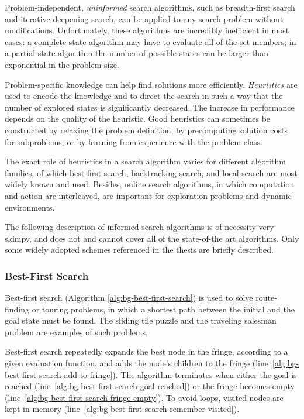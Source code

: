 Problem-independent, {\it uninformed} search algorithms, such as
breadth-first search and iterative deepening search, can be
applied to any search problem without modifications. Unfortunately,
these algorithms are incredibly inefficient in most cases: a
complete-state algorithm may have to evaluate all of the set members;
in a partial-state algorithm the number of possible states can be
larger than exponential in the problem size. 

Problem-specific knowledge can help find solutions more
efficiently. {\em Heuristics} are used to encode the knowledge and to
direct the search in such a way that the number of explored states is
significantly decreased. The increase in performance depends on the
quality of the heuristic. Good heuristics can sometimes be constructed
by relaxing the problem definition, by precomputing solution costs for
subproblems, or by learning from experience with the problem class.

The exact role of heuristics in a search algorithm varies for
different algorithm families, of which best-first search, backtracking
search, and local search are most widely known and used. Besides, online
search algorithms, in which computation and action are interleaved,
are important for exploration problems and dynamic environments.

The following description of informed search algorithms is of
necessity very skimpy, and does not and cannot cover all of the
state-of-the art algorithms. Only some widely adopted schemes
referenced in the thesis are briefly described.
                             
\subsubsection{Best-First Search}

Best-first search (Algorithm \ref{alg:bg-best-first-search}) is used to
solve route-finding or touring problems, in which a shortest path
between the initial and the goal state must be found. The sliding tile
puzzle and the traveling salesman problem are examples of such
problems.

Best-first search repeatedly expands the best node in the fringe,
according to a given evaluation function, and adds the node's children
to the fringe (line~\ref{alg:bg-best-first-search-add-to-fringe}). The
algorithm terminates when either the goal is reached
(line~\ref{alg:bg-best-first-search-goal-reached}) or the fringe becomes
empty (line~\ref{alg:bg-best-first-search-fringe-empty}). To avoid
loops, visited nodes are kept in memory (line~\ref{alg:bg-best-first-search-remember-visited}).

